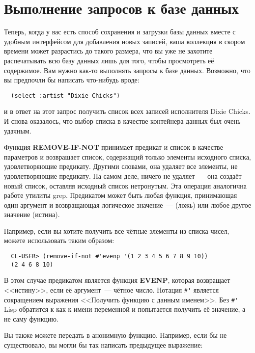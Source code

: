 \section{Выполнение запросов к базе данных}

Теперь, когда у вас есть способ сохранения и загрузки базы данных вместе с удобным
интерфейсом для добавления новых записей, ваша коллекция в скором времени может разрастись
до такого размера, что вы уже не захотите распечатывать всю базу данных лишь для того,
чтобы просмотреть её содержимое. Вам нужно как-то выполнять запросы к базе
данных. Возможно, что вы предпочли бы написать что-нибудь вроде:

\begin{verbatim}
  (select :artist "Dixie Chicks")
\end{verbatim}

и в ответ на этот запрос получить список всех записей исполнителя Dixie Chicks. И снова
оказалось, что выбор списка в качестве контейнера данных был очень удачным.

Функция \textbf{REMOVE-IF-NOT} принимает предикат и список в качестве параметров и
возвращает список, содержащий только элементы исходного списка, удовлетворяющие
предикату. Другими словами, она удаляет все элементы, не удовлетворяющие предикату. На
самом деле,  ничего не удаляет~--- она создаёт новый список, оставляя
исходный список нетронутым. Эта операция аналогична работе утилиты grep. Предикатом может
быть любая функция, принимающая один аргумент и возвращающая логическое значение~---
 (ложь) или любое другое значение (истина).

Например, если вы хотите получить все чётные элементы из списка чисел, можете использовать
 таким образом:

\begin{verbatim}
  CL-USER> (remove-if-not #'evenp '(1 2 3 4 5 6 7 8 9 10))
  (2 4 6 8 10)
\end{verbatim}

В этом случае предикатом является функция \textbf{EVENP}, которая возвращает <<истину>>,
если её аргумент~--- чётное число. Нотация \lstinline!#'! является сокращением выражения
<<Получить функцию с данным именем>>. Без \lstinline!#'! Lisp обратится к  как к
имени переменной и попытается получить её значение, а не саму функцию.

Вы также можете передать в  анонимную функцию. Например, если бы
 не существовало, вы могли бы так написать предыдущее выражение:

